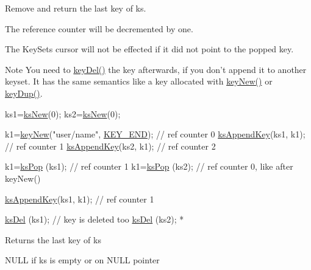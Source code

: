 Remove and return the last key of {\ttfamily ks}.

The reference counter will be decremented by one.

The Key\-Sets cursor will not be effected if it did not point to the popped key.

\begin{DoxyNote}{Note}
You need to \hyperlink{group__key_ga3df95bbc2494e3e6703ece5639be5bb1}{key\-Del()} the key afterwards, if you don't append it to another keyset. It has the same semantics like a key allocated with \hyperlink{group__key_gaf6893c038b3ebee90c73a9ea8356bebf}{key\-New()} or \hyperlink{group__key_gae6ec6a60cc4b8c1463fa08623d056ce3}{key\-Dup()}.
\end{DoxyNote}

\begin{DoxyCode}
ks1=\hyperlink{group__keyset_ga671e1aaee3ae9dc13b4834a4ddbd2c3c}{ksNew}(0);
ks2=\hyperlink{group__keyset_ga671e1aaee3ae9dc13b4834a4ddbd2c3c}{ksNew}(0);

k1=\hyperlink{group__key_gaf6893c038b3ebee90c73a9ea8356bebf}{keyNew}(\textcolor{stringliteral}{"user/name"}, \hyperlink{group__key_gga91fb3178848bd682000958089abbaf40aa8adb6fcb92dec58fb19410eacfdd403}{KEY\_END}); \textcolor{comment}{// ref counter 0}
\hyperlink{group__keyset_gaa5a1d467a4d71041edce68ea7748ce45}{ksAppendKey}(ks1, k1); \textcolor{comment}{// ref counter 1}
\hyperlink{group__keyset_gaa5a1d467a4d71041edce68ea7748ce45}{ksAppendKey}(ks2, k1); \textcolor{comment}{// ref counter 2}

k1=\hyperlink{group__keyset_gae42530b04defb772059de0600159cf69}{ksPop} (ks1); \textcolor{comment}{// ref counter 1}
k1=\hyperlink{group__keyset_gae42530b04defb772059de0600159cf69}{ksPop} (ks2); \textcolor{comment}{// ref counter 0, like after keyNew()}

\hyperlink{group__keyset_gaa5a1d467a4d71041edce68ea7748ce45}{ksAppendKey}(ks1, k1); \textcolor{comment}{// ref counter 1}

\hyperlink{group__keyset_ga27e5c16473b02a422238c8d970db7ac8}{ksDel} (ks1); \textcolor{comment}{// key is deleted too}
\hyperlink{group__keyset_ga27e5c16473b02a422238c8d970db7ac8}{ksDel} (ks2);
 *
\end{DoxyCode}


\begin{DoxyReturn}{Returns}
the last key of {\ttfamily ks} 

N\-U\-L\-L if {\ttfamily ks} is empty or on N\-U\-L\-L pointer 
\end{DoxyReturn}

